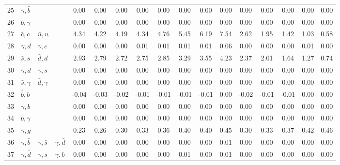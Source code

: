 \begin{tabularx}{\textwidth}{rXXX@{}S@{}S@{}S@{}S@{}S@{}S@{}S@{}S@{}S@{}S@{}S@{}S@{}S}
  25 & $\gamma,\bar b$ &                 &                 &  0.00 &  0.00 &  0.00 &  0.00 &  0.00 &  0.00 &  0.00 &  0.00 &  0.00 &  0.00 &  0.00 &  0.00 &  0.00 \\
  26 & $b,\gamma$      &                 &                 &  0.00 &  0.00 &  0.00 &  0.00 &  0.00 &  0.00 &  0.00 &  0.00 &  0.00 &  0.00 &  0.00 &  0.00 &  0.00 \\
  27 & $\bar c,c$      & $\bar u, u$     &                 &  4.34 &  4.22 &  4.19 &  4.34 &  4.76 &  5.45 &  6.19 &  7.54 &  2.62 &  1.95 &  1.42 &  1.03 &  0.58 \\
  28 & $\gamma, d$     & $\gamma, c$     &                 &  0.00 &  0.00 &  0.00 &  0.01 &  0.01 &  0.01 &  0.01 &  0.06 &  0.00 &  0.00 &  0.00 &  0.01 &  0.00 \\
  29 & $\bar s,s$      & $\bar d, d$     &                 &  2.93 &  2.79 &  2.72 &  2.75 &  2.85 &  3.29 &  3.55 &  4.23 &  2.37 &  2.01 &  1.64 &  1.27 &  0.74 \\
  30 & $\gamma,d$      & $\gamma, s$     &                 &  0.00 &  0.00 &  0.00 &  0.00 &  0.00 &  0.00 &  0.00 &  0.00 &  0.00 &  0.00 &  0.00 &  0.00 &  0.00 \\
  31 & $\bar s,\gamma$ & $\bar d,\gamma$ &                 &  0.00 &  0.00 &  0.00 &  0.00 &  0.00 &  0.00 &  0.00 &  0.00 &  0.00 &  0.00 &  0.00 &  0.00 &  0.00 \\
  32 & $\bar b,b$      &                 &                 & -0.04 & -0.03 & -0.02 & -0.01 & -0.01 & -0.01 & -0.01 &  0.00 & -0.02 & -0.01 & -0.01 &  0.00 &  0.00 \\
  33 & $\gamma, b$     &                 &                 &  0.00 &  0.00 &  0.00 &  0.00 &  0.00 &  0.00 &  0.00 &  0.00 &  0.00 &  0.00 &  0.00 &  0.00 &  0.00 \\
  34 & $\bar b,\gamma$ &                 &                 &  0.00 &  0.00 &  0.00 &  0.00 &  0.00 &  0.00 &  0.00 &  0.00 &  0.00 &  0.00 &  0.00 &  0.00 &  0.00 \\
  35 & $\gamma,g$      &                 &                 &  0.23 &  0.26 &  0.30 &  0.33 &  0.36 &  0.40 &  0.40 &  0.45 &  0.30 &  0.33 &  0.37 &  0.42 &  0.46 \\
  36 & $\gamma,\bar b$ & $\gamma,\bar s$ & $\gamma,\bar d$ &  0.00 &  0.00 &  0.00 &  0.00 &  0.00 &  0.00 &  0.00 &  0.01 &  0.00 &  0.00 &  0.00 &  0.00 &  0.00 \\
  37 & $\gamma,\bar d$ & $\gamma,s$      & $\gamma,b$      &  0.00 &  0.00 &  0.00 &  0.00 &  0.00 &  0.01 &  0.00 &  0.01 &  0.00 &  0.00 &  0.00 &  0.00 &  0.00 \\
  \bottomrule
\end{tabularx}
